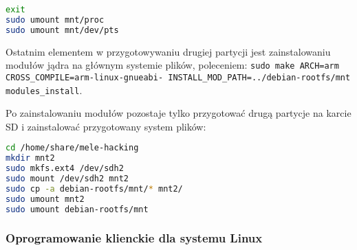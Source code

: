 \begin{lstlisting}[language=bash]
exit
sudo umount mnt/proc
sudo umount mnt/dev/pts
\end{lstlisting}

Ostatnim elementem w przygotowywaniu drugiej partycji jest zainstalowaniu modułów jądra na głównym systemie plików, poleceniem: \lstinline|sudo make ARCH=arm CROSS_COMPILE=arm-linux-gnueabi- INSTALL_MOD_PATH=../debian-rootfs/mnt modules_install|.

Po zainstalowaniu modułów pozostaje tylko przygotować drugą partycje na karcie SD i zainstalować przygotowany system plików:
\begin{lstlisting}[language=bash]
cd /home/share/mele-hacking
mkdir mnt2
sudo mkfs.ext4 /dev/sdh2 
sudo mount /dev/sdh2 mnt2
sudo cp -a debian-rootfs/mnt/* mnt2/
sudo umount mnt2
sudo umount debian-rootfs/mnt
\end{lstlisting}

\subsubsection{Oprogramowanie klienckie dla systemu Linux}

